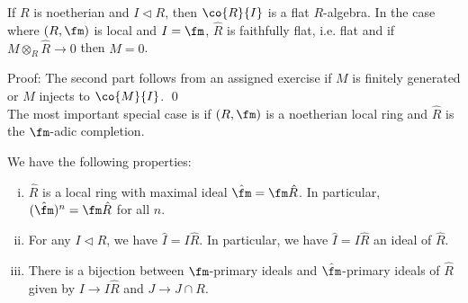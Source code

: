 \begin{cor}
If $R$ is noetherian and $I\lhd R$, then $\co{R}{I}$ is a flat $R$-algebra. In the case where $(R,\fm)$ is local and $I=\fm$, $\hat{R}$ is faithfully flat, i.e. flat and if $M \otimes_R \hat{R} \to 0$ then $M=0$.
\end{cor}

\noindent Proof: The second part follows from an assigned exercise if $M$ is finitely generated or $M$ injects to $\co{M}{I}$. \qed \\

The most important special case is if $(R,\fm)$ is a noetherian local ring and $\hat{R}$ is the $\fm$-adic completion. 

\begin{prop} We have the following properties:
\begin{enumerate}[(i)]
\item $\hat{R}$ is a local ring with maximal ideal $\hat{\fm}=\fm \hat{R}$. In particular, $(\hat{\fm})^n=\fm \hat{R}$ for all $n$. 
\item For any $I \lhd R$, we have $\hat{I}=I \hat{R}$. In particular, we have $\hat{I}=I \hat{R}$ an ideal of $\hat{R}$.
\item There is a bijection between $\fm$-primary ideals and $\hat{\fm}$-primary ideals of $\hat{R}$ given by $I \to I\hat{R}$ and $J \to J \cap R$. 
\end{enumerate}
\end{prop}

